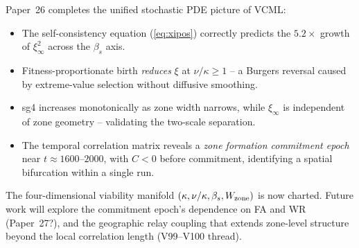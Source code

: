 \documentclass[11pt,a4paper]{article}
\begin{document}
Paper~26 completes the unified stochastic PDE picture of VCML:
\begin{itemize}
  \item The self-consistency equation (\ref{eq:xipos}) correctly predicts the
        $5.2\times$ growth of $\xi_\infty^2$ across the $\beta_s$ axis.
  \item Fitness-proportionate birth \emph{reduces} $\xi$ at $\nu/\kappa \geq 1$
        -- a Burgers reversal caused by extreme-value selection without diffusive
        smoothing.
  \item sg4 increases monotonically as zone width narrows, while $\xi_\infty$
        is independent of zone geometry -- validating the two-scale separation.
  \item The temporal correlation matrix reveals a \emph{zone formation
        commitment epoch} near $t \approx 1600$--$2000$, with $C < 0$ before
        commitment, identifying a spatial bifurcation within a single run.
\end{itemize}

The four-dimensional viability manifold $(\kappa, \nu/\kappa, \beta_s,
W_{\rm zone})$ is now charted.  Future work will explore the commitment epoch's
dependence on FA and WR (Paper~27?), and the geographic relay coupling that
extends zone-level structure beyond the local correlation length (V99--V100
thread).
\end{document}
